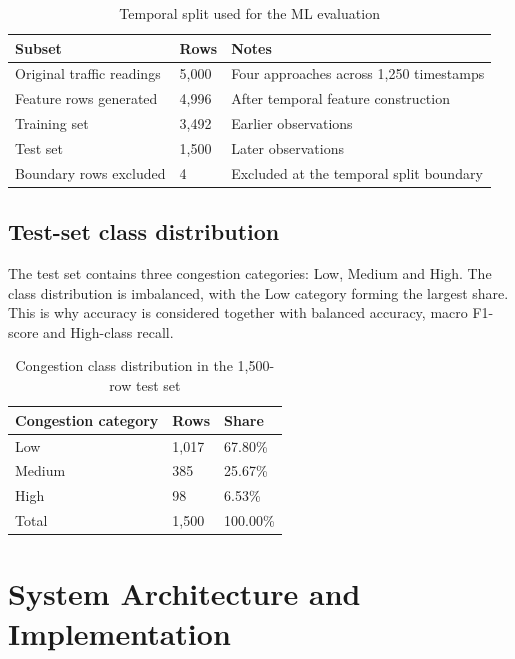 \documentclass[12pt,a4paper,oneside]{report}
\begin{document}
\begin{table}[htbp]\centering\small
\caption{Temporal split used for the ML evaluation}\label{tab:split}
\begin{tabular}{|p{}|p{}|p{}|}\hline
\textbf{Subset} & \textbf{Rows} & \textbf{Notes} \\\hline
Original traffic readings & 5,000 & Four approaches across 1,250 timestamps \\\hline
Feature rows generated & 4,996 & After temporal feature construction \\\hline
Training set & 3,492 & Earlier observations \\\hline
Test set & 1,500 & Later observations \\\hline
Boundary rows excluded & 4 & Excluded at the temporal split boundary \\\hline
\end{tabular}\end{table}

\section{Test-set class distribution}
The test set contains three congestion categories: Low, Medium and High. The class distribution is imbalanced, with the Low category forming the largest share. This is why accuracy is considered together with balanced accuracy, macro F1-score and High-class recall.

\begin{table}[htbp]\centering\small
\caption{Congestion class distribution in the 1,500-row test set}\label{tab:class-dist}
\begin{tabular}{|p{}|p{}|p{}|}\hline
\textbf{Congestion category} & \textbf{Rows} & \textbf{Share} \\\hline
Low & 1,017 & 67.80\% \\\hline
Medium & 385 & 25.67\% \\\hline
High & 98 & 6.53\% \\\hline
Total & 1,500 & 100.00\% \\\hline
\end{tabular}\end{table}

\clearpage
\chapter{System Architecture and Implementation}
\end{document}
